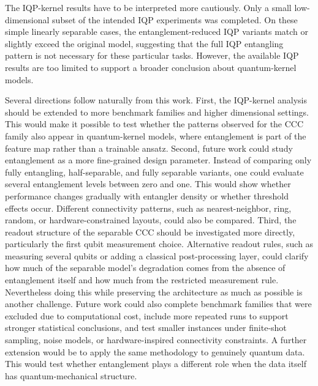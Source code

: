 \documentclass[12pt,a4paper,openany]{report}
\begin{document}
The IQP-kernel results have to be interpreted more cautiously. Only a small low-dimensional subset of the intended IQP experiments was completed. On these simple linearly separable cases, the entanglement-reduced IQP variants match or slightly exceed the original model, suggesting that the full IQP entangling pattern is not necessary for these particular tasks. However, the available IQP results are too limited to support a broader conclusion about quantum-kernel models.

Several directions follow naturally from this work. First, the IQP-kernel analysis should be extended to more benchmark families and higher dimensional settings. This would make it possible to test whether the patterns observed for the CCC family also appear in quantum-kernel models, where entanglement is part of the feature map rather than a trainable ansatz. Second, future work could study entanglement as a more fine-grained design parameter. Instead of comparing only fully entangling, half-separable, and fully separable variants, one could evaluate several entanglement levels between zero and one. This would show whether performance changes gradually with entangler density or whether threshold effects occur. Different connectivity patterns, such as nearest-neighbor, ring, random, or hardware-constrained layouts, could also be compared. Third, the readout structure of the separable CCC should be investigated more directly, particularly the first qubit measurement choice. Alternative readout rules, such as measuring several qubits or adding a classical post-processing layer, could clarify how much of the separable model's degradation comes from the absence of entanglement itself and how much from the restricted measurement rule. Nevertheless doing this while preserving the architecture as much as possible is another challenge. Future work could also complete benchmark families that were excluded due to computational cost, include more repeated runs to support stronger statistical conclusions, and test smaller instances under finite-shot sampling, noise models, or hardware-inspired connectivity constraints. A further extension would be to apply the same methodology to genuinely quantum data. This would test whether entanglement plays a different role when the data itself has quantum-mechanical structure.



\end{document}
